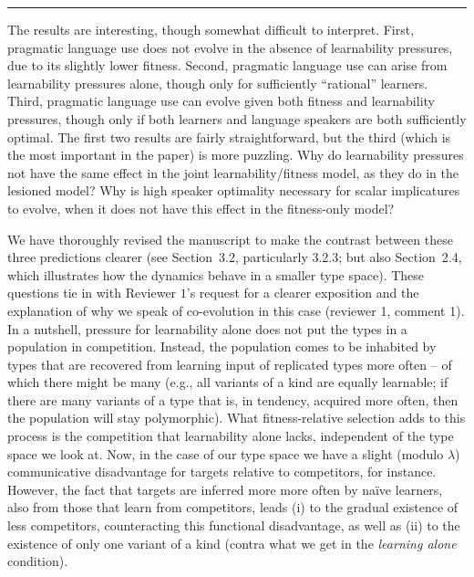 \documentclass[12pt,a4paper]{article}
\begin{document}
\vspace{0.5cm}




\noindent\rule{\textwidth}{1pt}

\begin{mdframed}[backgroundcolor=gray!25,linecolor=gray!25,frametitle= Reviewer \thereviewerCounter~comment \thereviewerCommentCounter \hfill ~~({\it Interpretation of results})]
%
The results are interesting, though somewhat difficult to interpret. First, pragmatic language use does not evolve in the absence of learnability pressures, due to its slightly lower fitness. Second, pragmatic language use can arise from learnability pressures alone, though only for sufficiently ``rational'' learners. Third, pragmatic language use can evolve given both fitness and learnability pressures, though only if both learners and language speakers are both sufficiently optimal. The first two results are fairly straightforward, but the third (which is the most important in the paper) is more puzzling. Why do learnability pressures not have the same effect in the joint learnability/fitness model, as they do in the lesioned model? Why is high speaker optimality necessary for scalar implicatures to evolve, when it does not have this effect in the fitness-only model?
\end{mdframed}

We have thoroughly revised the manuscript to make the contrast between these three predictions clearer (see Section~3.2, particularly 3.2.3; but also Section~2.4, which illustrates how the dynamics behave in a smaller type space). These questions tie in with Reviewer $1$'s request for a clearer exposition and the explanation of why we speak of co-evolution in this case (reviewer 1, comment 1). In a nutshell, pressure for learnability alone does not put the types in a population in competition. Instead, the population comes to be inhabited by types that are recovered from learning input of replicated types more often -- of which there might be many (e.g., all variants of a kind are equally learnable; if there are many variants of a type that is, in tendency, acquired more often, then the population will stay polymorphic). What fitness-relative selection adds to this process is the competition that learnability alone lacks, independent of the type space we look at. Now, in the case of our type space we have a slight (modulo $\lambda$) communicative disadvantage for targets relative to competitors, for instance. However, the fact that targets are inferred more more often by na\"ive learners, also from those that learn from competitors, leads (i) to the gradual existence of less competitors, counteracting this functional disadvantage, as well as (ii) to the existence of only one variant of a kind (contra what we get in the {\em learning alone} condition).
%
\end{document}
